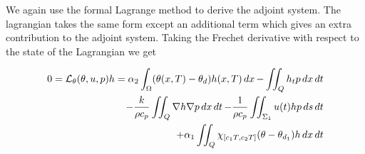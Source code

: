 We again use the formal Lagrange method to derive the adjoint system. The lagrangian takes the same form except an additional term which gives an extra contribution to the adjoint system. Taking the Frechet derivative with respect to the state of the Lagrangian we get

\begin{equation}
  \begin{aligned}
  0 = \mathcal{L}_\theta(\theta, u, p)h = \alpha_2 \int_\Omega (\theta(x,T) - \theta_d)h(x, T)\mathop{dx} - \iint_Q h_t p\mathop{dx}\mathop{dt} \\
  - \frac{k}{\rho c_p}\iint_Q\nabla h\nabla p \mathop{dx}\mathop{dt}
  - \frac{1}{\rho c_p}\iint_{\Sigma_1} u(t)h p\mathop{ds}\mathop{dt} \\
  + \alpha_1 \iint_{Q}\chi_{[c_1T,c_2T]}(\theta - \theta_{d_1})h \mathop{dx}\mathop{dt}
  \end{aligned}
\end{equation}